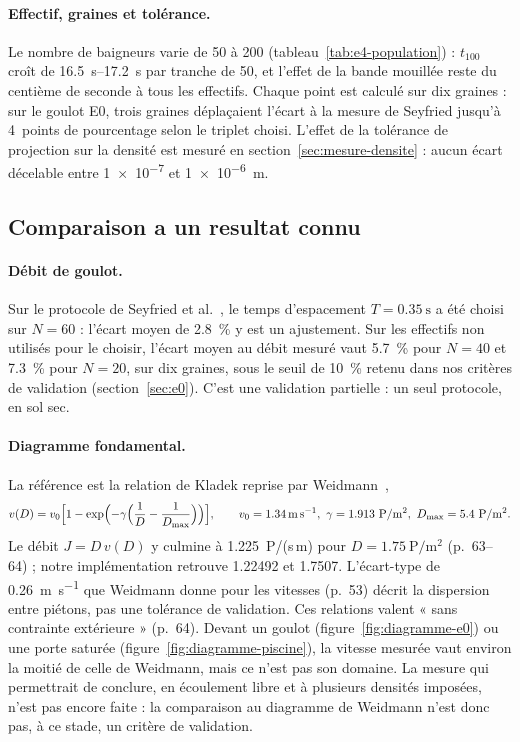 \paragraph{Effectif, graines et tolérance.} Le nombre de baigneurs varie de 50 à 200
(tableau~\ref{tab:e4-population}) : $t_{100}$ croît de \SIrange{16.5}{17.2}{\second} par
tranche de 50, et l'effet de la bande mouillée reste du centième de seconde à tous les
effectifs. Chaque point est calculé sur dix graines : sur le goulot E0, trois graines
déplaçaient l'écart à la mesure de Seyfried jusqu'à 4~points de pourcentage selon le triplet choisi.
L'effet de la tolérance de projection sur la densité est mesuré en
section~\ref{sec:mesure-densite} : aucun écart décelable entre \num{1e-7} et
\SI{1e-6}{\metre}.

\subsection{Comparaison a un resultat connu}
\label{sec:comparaison}

\paragraph{Débit de goulot.} Sur le protocole de Seyfried et
al.~\cite{seyfried2009}, le temps d'espacement $T=\SI{0.35}{\second}$ a été choisi sur
$N=60$ : l'écart moyen de \SI{2.8}{\percent} y est un ajustement. Sur les effectifs non
utilisés pour le choisir, l'écart moyen au débit mesuré vaut \SI{5.7}{\percent} pour $N=40$
et \SI{7.3}{\percent} pour $N=20$, sur dix graines, sous le seuil de \SI{10}{\percent} retenu
dans nos critères de validation (section~\ref{sec:e0}). C'est une validation partielle : un seul protocole, en
sol sec.

\paragraph{Diagramme fondamental.} La référence est la relation de Kladek reprise par
Weidmann~\cite[\S\,4.31.1, p.~62]{weidmann1993},
\[
v(D)=v_0\Bigl[1-\exp\Bigl(-\gamma\Bigl(\frac1D-\frac1{D_{\max}}\Bigr)\Bigr)\Bigr],
\qquad v_0=\SI{1.34}{\metre\per\second},\ \gamma=\num{1.913}~\mathrm{P/m^2},\
D_{\max}=\num{5.4}~\mathrm{P/m^2}.
\]
Le débit $J=D\,v(D)$ y culmine à \num{1.225}~P/(s\,m) pour $D=\num{1.75}~\mathrm{P/m^2}$
(p.~63--64) ; notre implémentation retrouve \num{1.22492} et \num{1.7507}. L'écart-type de
\SI{0.26}{\metre\per\second} que Weidmann donne pour les vitesses (p.~53) décrit la
dispersion entre piétons, pas une tolérance de validation. Ces relations valent « sans
contrainte extérieure » (p.~64). Devant un goulot (figure~\ref{fig:diagramme-e0}) ou une
porte saturée (figure~\ref{fig:diagramme-piscine}), la vitesse mesurée vaut environ la
moitié de celle de Weidmann, mais ce n'est pas son domaine. La mesure qui permettrait de
conclure, en écoulement libre et à plusieurs densités imposées, n'est pas encore faite : la
comparaison au diagramme de Weidmann n'est donc pas, à ce stade, un critère de validation.

